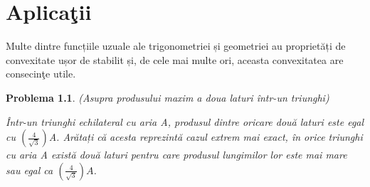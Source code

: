 \documentclass[a4paper,12pt,oneside]{report}
\newtheorem{problem}{Problema}
\begin{document}
%
%
%
%


\chapter{Aplica\c{t}ii}

Multe dintre funcțiile uzuale ale trigonometriei și geometriei au proprietăți de convexitate ușor de stabilit și, de cele mai multe ori, aceasta convexitatea are consecinţe utile.

\begin{problem}(Asupra produsului maxim a doua laturi într-un triunghi)

Într-un triunghi echilateral cu aria A, produsul dintre oricare două laturi este egal cu \(\left (\frac{4}{\sqrt{3}}  \right )\)A. Arătați că acesta reprezintă cazul extrem mai exact, în orice triunghi cu aria A  există două laturi pentru care produsul lungimilor lor este mai mare sau egal ca \(\left (\frac{4}{\sqrt{3}}  \right )A\).
\end{problem}
\end{document}
